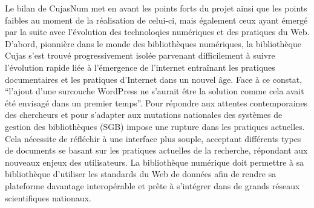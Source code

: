 Le bilan de CujasNum met en avant les points forts du projet ainsi que les points faibles au moment de la réalisation de celui-ci, mais également ceux ayant émergé par la suite avec l'évolution des technoloqies numériques et des pratiques du Web. D'abord, pionnière dans le monde des bibliothèques numériques, la bibliothèque Cujas s'est trouvé progressivement isolée parvenant difficilement à suivre l'évolution rapide liée à l'émergence de l'internet entraînant les pratiques documentaires et les pratiques d'Internet dans un nouvel âge. Face à ce constat, \enquote{l'ajout d'une surcouche WordPress ne s'aurait être la solution comme cela avait été envisagé dans un premier temps}. Pour répondre aux attentes contemporaines des chercheurs et pour s'adapter aux mutations nationales des systèmes de gestion des bibliothèques (SGB) impose une rupture dans les pratiques actuelles. Cela nécessite de réfléchir à une interface plus souple, acceptant différents types de documents se basant sur les pratiques actuelles de la recherche, répondant aux nouveaux enjeux des utilisateurs. La bibliothèque numérique doit permettre à sa bibliothèque d'utiliser les standards du Web de données afin de rendre sa plateforme davantage interopérable et prête à s'intégrer dans de grands réseaux scientifiques nationaux.